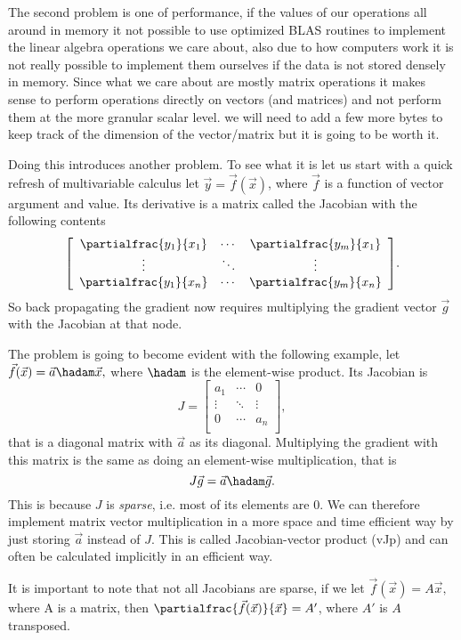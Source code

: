 \documentclass{article}
\begin{document}
The second problem is one of performance, if the values of our operations all
around in memory it not possible to use optimized BLAS routines to implement
the linear algebra operations we care about, also due to how computers work it
is not really possible to implement them ourselves if the data is not stored
densely in memory. Since what we care about are mostly matrix operations it
makes sense to perform operations directly on vectors (and matrices) and not
perform them at the more granular scalar level. we will need to add a few more
bytes to keep track of the dimension of the vector/matrix but it is going to be
worth it.

Doing this introduces another problem. To see what it is let us start with a
quick refresh of multivariable calculus let \(\vec y = \vec f(\vec x)\), where
\(\vec f\) is a function of vector argument and value. Its derivative is a
matrix called the Jacobian with the following contents \[
\left[\begin{array}{ccc}
\partialfrac{y_1}{x_1} & \cdots & \partialfrac{y_m}{x_1} \\
\vdots & \ddots & \vdots \\
\partialfrac{y_1}{x_n} & \cdots & \partialfrac{y_m}{x_n} \\
\end{array}\right]\!.
\] So back propagating the gradient now requires multiplying the gradient
vector \(\vec g\) with the Jacobian at that node.

The problem is going to become evident with the following example, let
\(\vec f(\vec x) = \vec a \hadam \vec x,\) where \(\hadam\) is the element-wise
product. Its Jacobian is \[
J = \left[\begin{array}{ccc}
a_1 & \cdots & 0 \\
\vdots & \ddots & \vdots \\
0 & \cdots & a_n \\
\end{array}\right]\!,
\] that is a diagonal matrix with \(\vec a\) as its diagonal. Multiplying the
gradient with this matrix is the same as doing an element-wise multiplication,
that is \[
J \vec g = \vec a \hadam \vec g.
\] This is because \(J\) is \emph{sparse}, i.e. most of its elements are 0.
We can therefore implement matrix vector multiplication in a more space and
time efficient way by just storing \(\vec a\) instead of \(J\). This is called
Jacobian-vector product (vJp) and can often be calculated implicitly in an
efficient way.

It is important to note that not all Jacobians are sparse, if we let \(\vec
f(\vec x) = A \vec x,\) where A is a matrix, then
\(\partialfrac{\vec f(\vec x)}{\vec x} = A'\), where \(A'\) is \(A\)
transposed.
\end{document}
